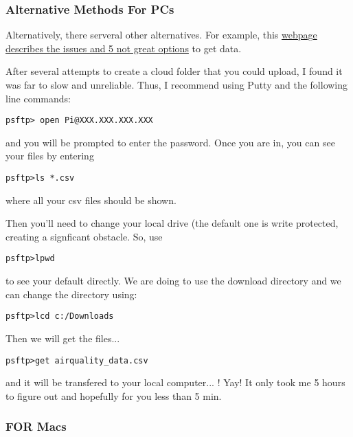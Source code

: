 \documentclass{article}\usepackage[]{graphicx}\usepackage[]{xcolor}
\begin{document}
\subsubsection{Alternative Methods For PCs} 

Alternatively, there serveral other alternatives. For example, this \href{https://www.makeuseof.com/tag/copy-data-raspberry-pi-pc/}{webpage describes the issues and 5 not great options} to get data. 

After several attempts to create a cloud folder that you could upload, I found it was far to slow and unreliable. Thus, I recommend using Putty and the following line commands:

\begin{lstlisting}
psftp> open Pi@XXX.XXX.XXX.XXX
\end{lstlisting}

and you will be prompted to enter the password. Once you are in, you can see your files by entering

\begin{lstlisting}
psftp>ls *.csv
\end{lstlisting}


\noindent where all your csv files should be shown. 

Then you'll need to change your local drive (the default one is write protected, creating a signficant obstacle. So, use 

\begin{lstlisting}
psftp>lpwd
\end{lstlisting}
 

\noindent to see your default directly. We are doing to use the download directory and we can change the directory using:

\begin{lstlisting}
psftp>lcd c:/Downloads
\end{lstlisting}

Then we will get the files...

\begin{lstlisting}
psftp>get airquality_data.csv
\end{lstlisting}


and it will be transfered to your local computer... !  Yay!  It only took me 5 hours to figure out and hopefully for you less than 5 min. 

\subsubsection{FOR Macs}
\end{document}
